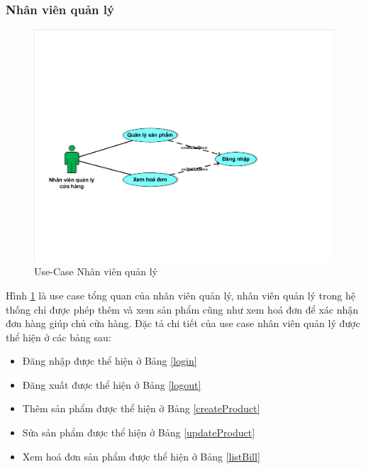 \subsubsection{Nhân viên quản lý}
\begin{center}
    \begin{figure}[h]
    \begin{center}
     \includegraphics[scale=0.7]{image/UseCaseTongQuanNV.pdf}
    \end{center}
    \caption{Use-Case Nhân viên quản lý}
    \label{refhinh3_4}
    \end{figure}
\end{center}
Hình \ref{refhinh3_4} là use case tổng quan của nhân viên quản lý, nhân viên quản lý trong hệ thống chỉ được phép thêm và xem sản phẩm cũng như xem hoá đơn để xác nhận đơn hàng giúp chủ cửa hàng. Đặc tả chi tiết của use case nhân viên quản lý được thể hiện ở các bảng sau:
\begin{itemize}
\item Đăng nhập được thể hiện ở Bảng \ref{login}
\item Đăng xuất được thể hiện ở Bảng \ref{logout}
\item Thêm sản phẩm được thể hiện ở Bảng \ref{createProduct}
\item Sửa sản phẩm được thể hiện ở Bảng \ref{updateProduct}
\item Xem hoá đơn sản phẩm được thể hiện ở Bảng \ref{listBill}
\end{itemize}
